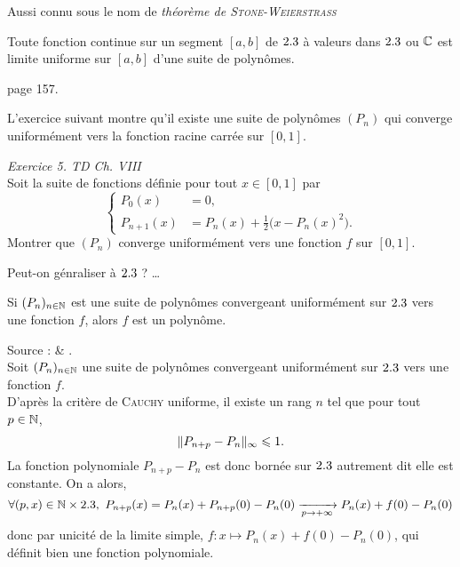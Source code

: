 Aussi connu sous le nom  de \emph{théorème de \textsc{Stone-Weierstrass}}

\begin{theo}
    Toute fonction continue sur un segment $[a, b]$ de $2.3$ à valeurs dans $2.3$ ou $\mathbb{C}$ est limite uniforme sur $[a, b]$ d'une suite de polynômes.
\end{theo}

\begin{preuve}
    \cite{calcul_infinitesimal} page 157.
\end{preuve} 

L'exercice suivant montre qu'il existe une suite de polynômes $(P_n)$ qui converge uniformément vers la fonction racine carrée sur $[0, 1]$.

\begin{exercice}
    \emph{Exercice 5. TD Ch. VIII}\\
    Soit la suite de fonctions définie pour tout $x \in [0, 1]$ par
    $$
    \begin{cases}
        P_0(x) &= 0,\\
        P_{n+1}(x) &= P_n (x) + \frac{1}{2} \big( x-P_n (x)^2 \big).
    \end{cases}
    $$
    Montrer que $(P_n)$ converge uniformément vers une fonction $f$ sur $[0, 1]$.
\end{exercice}

\begin{marginfigure}[-5cm]
	
\end{marginfigure}

Peut-on génraliser à $2.3$ ? \dots

\begin{tcolorbox}
    Si $(P_n)_{n \in \mathbb{N}}$ est une suite de polynômes convergeant uniformément sur $2.3$ vers une fonction $f$, alors $f$ est un polynôme.
\end{tcolorbox}

\begin{preuve}
    Source : \cite{exos_oraux} \& \cite{maths-france}. \\
    Soit $(P_n)_{n \in \mathbb{N}}$ une suite de polynômes convergeant uniformément sur $2.3$ vers une fonction $f$. \\
    D'après la critère de \textsc{Cauchy} uniforme, il existe un rang $n$ tel que pour tout $p \in \mathbb{N}$, 
    $$\Vert P_{n+p} - P_n \Vert_\infty \leqslant 1.$$
    La fonction polynomiale $P_{n+p} - P_n$ est donc bornée sur $2.3$ autrement dit elle est constante. On a alors,
    $$\forall (p, x) \in \mathbb{N} \times 2.3,\ P_{n+p}(x) = P_n(x) + P_{n+p}(0) - P_n(0) \xrightarrow[p \to + \infty]{} P_n(x) + f(0) - P_n(0)$$
    donc par unicité de la limite simple, $f : x \mapsto P_n(x) + f(0) - P_n(0)$, qui définit bien une fonction polynomiale. 
\end{preuve}